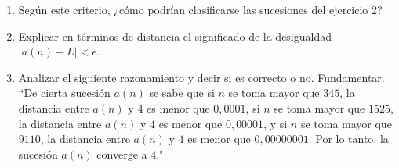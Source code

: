 \documentclass[12pt]{article}
\theoremstyle{definition}
\newtheorem*{mydef}{Definición}
\begin{document}
\begin{enumerate}
\vspace{1 cm}
\item Según este criterio, ¿cómo podrían clasificarse las sucesiones del ejercicio 2?

\vspace{1cm}



\vspace{0.5 cm}
\vspace{0.5 cm}
\item Explicar en términos de distancia el significado de la desigualdad $|a(n) - L| < \epsilon$.

\item Analizar el siguiente razonamiento y decir si es correcto o no. Fundamentar. \\
“De cierta sucesión $a(n)$ se sabe que si $n$ se toma mayor que $345$, la distancia entre $a(n)$ y $4$ es menor que $0,0001$, si $n$ se toma mayor que $1525$, la distancia entre $a(n)$ y $4$ es menor que $0,00001$, y si $n$ se toma mayor que $9110$, la distancia entre $a(n)$ y $4$ es menor que $0,00000001$. Por lo tanto, la sucesión $a(n)$ converge a $4$."


\end{enumerate}
\end{document}
